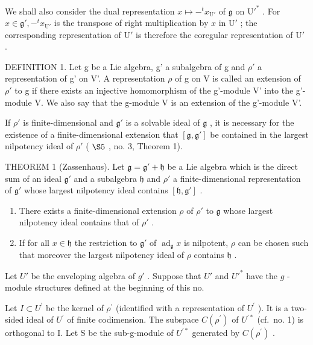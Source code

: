 We shall also consider the dual representation \(x \mapsto -^{t}x_{\mathrm{U}'}\) of \(\mathfrak{g}\) on \(\mathrm{U}'^*\) . For \(x \in \mathfrak{g}', -^{t}x_{\mathrm{U}'}\) is the transpose of right multiplication by \(x\) in \(\mathrm{U}'\) ; the corresponding representation of \(\mathrm{U}'\) is therefore the coregular representation of \(\mathrm{U}'\) .

DEFINITION 1. Let g be a Lie algebra, g' a subalgebra of g and \(\rho'\) a representation of g' on V'. A representation \(\rho\) of g on V is called an extension of \(\rho'\) to g if there exists an injective homomorphism of the g'-module V' into the g'-module V. We also say that the g-module V is an extension of the g'-module V'.

If \(\rho'\) is finite-dimensional and \(\mathfrak{g}'\) is a solvable ideal of \(\mathfrak{g}\) , it is necessary for the existence of a finite-dimensional extension that \([\mathfrak{g},\mathfrak{g}']\) be contained in the largest nilpotency ideal of \(\rho'\) ( \(\S 5\) , no. 3, Theorem 1).

THEOREM 1 (Zassenhaus). Let \(\mathfrak{g} = \mathfrak{g}' + \mathfrak{h}\) be a Lie algebra which is the direct sum of an ideal \(\mathfrak{g}'\) and a subalgebra \(\mathfrak{h}\) and \(\rho'\) a finite-dimensional representation of \(\mathfrak{g}'\) whose largest nilpotency ideal contains \([\mathfrak{h},\mathfrak{g}']\) .

\begin{enumerate}
\def\labelenumi{(\alph{enumi})}
\item
  There exists a finite-dimensional extension \(\rho\) of \(\rho'\) to \(\mathfrak{g}\) whose largest nilpotency ideal contains that of \(\rho'\) .
\item
  If for all \(x \in \mathfrak{h}\) the restriction to \(\mathfrak{g}'\) of \(\operatorname{ad}_{\mathfrak{g}}x\) is nilpotent, \(\rho\) can be chosen such that moreover the largest nilpotency ideal of \(\rho\) contains \(\mathfrak{h}\) .
\end{enumerate}

Let \(U'\) be the enveloping algebra of \(g'\) . Suppose that \(U'\) and \(U'^*\) have the \(g\) -module structures defined at the beginning of this no.

Let \(I \subset U^{\prime}\) be the kernel of \(\rho^{\prime}\) (identified with a representation of \(U^{\prime}\) ). It is a two-sided ideal of \(U^{\prime}\) of finite codimension. The subspace \(C(\rho^{\prime})\) of \(U^{\prime*}\) (cf.~no. 1) is orthogonal to I. Let S be the sub-g-module of \(U^{\prime*}\) generated by \(C(\rho^{\prime})\) .

